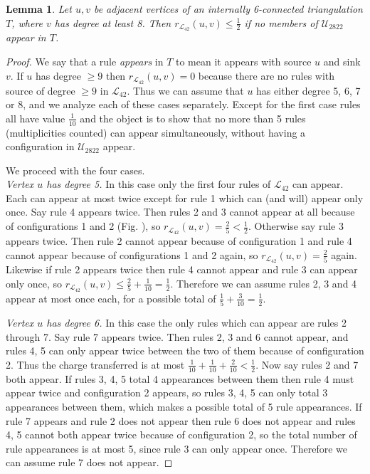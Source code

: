 \documentclass[11pt]{article}
\newtheorem{lemma}[theorem]{Lemma}     %
\newcommand{\m}{\mathcal}
\newcommand{\ncmath}{2822}
\begin{document}
\begin{lemma}\label{lastly}
Let $u, v$ be adjacent vertices of an internally 6-connected triangulation $T$, where $v$ has degree at least 8. Then $r_{\m{L}_{42}}(u, v) \leq \frac{1}{2}$ if no members of $\m{U}_{\ncmath}$ appear in $T$.
\end{lemma}
\begin{proof}
We say that a rule \emph{appears} in $T$ to mean it appears with source $u$ and sink $v$. If $u$ has degree $\geq 9$ then $r_{\m{L}_{42}}(u,v) = 0$ because there are no rules with source of degree $\geq 9$ in $\m{L}_{42}$. Thus we can assume that $u$ has either degree 5, 6, 7 or 8, and we analyze each of these cases separately. Except for the first case rules all have value $\frac{1}{10}$ and the object is to show that no more than 5 rules (multiplicities counted) can appear simultaneously, without having a configuration in $\m{U}_{\ncmath}$ appear. 

We proceed with the four cases.\\

\noindent \emph{Vertex $u$ has degree 5.} In this case only the first four rules of $\m{L}_{42}$ can appear. Each can appear at most twice except for rule 1 which can (and will) appear only once. Say rule 4 appears twice. Then rules 2 and 3 cannot appear at all because of configurations 1 and 2 (Fig$.$ ), so $r_{\m{L}_{42}}(u, v) = \frac{2}{5} < \frac{1}{2}$. 
Otherwise say rule 3 appears twice. Then rule 2 cannot appear because of configuration 1 and rule 4 cannot appear because of configurations 1 and 2 again, so $r_{\m{L}_{42}}(u, v) = \frac{2}{5}$ again. Likewise if rule 2 appears twice then rule 4 cannot appear and rule 3 can appear only once, so $r_{\m{L}_{42}}(u, v) \leq \frac{2}{5} + \frac{1}{10} = \frac{1}{2}$. Therefore we can assume rules 2, 3 and 4 appear at most once each, for a possible total of $\frac{1}{5} + \frac{3}{10} = \frac{1}{2}$.\\

\degreetwelvefig

\noindent \emph{Vertex $u$ has degree 6.} In this case the only rules which can appear are rules 2 through 7. Say rule 7 appears twice. Then rules 2, 3 and 6 cannot appear, and rules 4, 5 can only appear twice between the two of them because of configuration 2. Thus the charge transferred is at most $\frac{1}{10} + \frac{1}{10} + \frac{2}{10} < \frac{1}{2}$.
Now say rules 2 and 7 both appear. If rules 3, 4, 5 total 4 appearances between them then rule 4 must appear twice and configuration 2 appears, so rules 3, 4, 5 can only total 3 appearances between them, which makes a possible total of 5 rule appearances. If rule 7 appears and rule 2 does not appear then rule 6 does not appear and rules 4, 5 cannot both appear twice because of configuration 2, so the total number of rule appearances is at most 5, since rule 3 can only appear once. Therefore we can assume rule 7 does not appear.


\end{proof}
\end{document}
